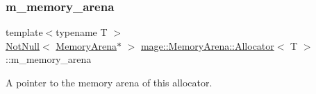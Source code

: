 \subsubsection{\texorpdfstring{m\+\_\+memory\+\_\+arena}{m\_memory\_arena}}
{\footnotesize\ttfamily template$<$typename T $>$ \\
\mbox{\hyperlink{namespacemage_a8769f9d670d6b585ea306cb1062af94b}{Not\+Null}}$<$ \mbox{\hyperlink{classmage_1_1_memory_arena}{Memory\+Arena}}$\ast$ $>$ \mbox{\hyperlink{classmage_1_1_memory_arena_1_1_allocator}{mage\+::\+Memory\+Arena\+::\+Allocator}}$<$ T $>$\+::m\+\_\+memory\+\_\+arena\hspace{0.3cm}{\ttfamily [private]}}

A pointer to the memory arena of this allocator. 